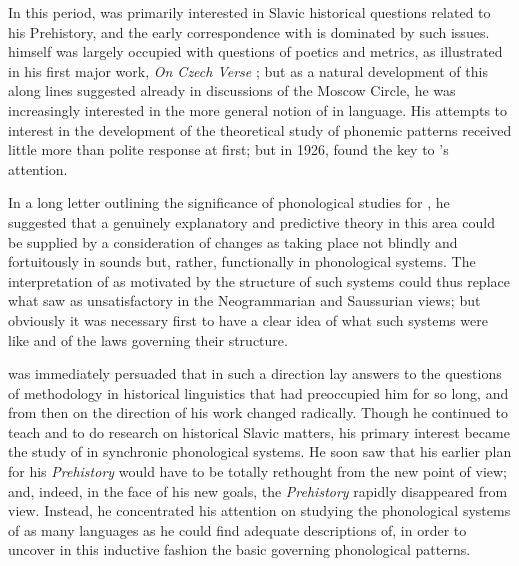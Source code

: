 In this period, {\Trubetzkoy} was primarily interested in Slavic
historical ques\-tions related to his Prehistory, and the early
correspondence with {\Jakobson} is dominated by such issues. {\Jakobson}
himself was largely occupied with questions of poetics and metrics, as
illustrated in his first major work, \textsl{On {Czech} Verse}
\citep{jakobson23:o.cesskom.stixe}; but as a natural development of
this along lines suggested already in discussions of the Moscow
Circle, he was increasingly interested in the more general notion of
 in language. His attempts to interest {\Trubetzkoy} in
the development of the theoretical study of phonemic patterns received
little more than polite response at first; but in 1926, {\Jakobson} found
the key to {\Trubetzkoy}'s attention.

In a long letter outlining the significance of phonological studies
for , he suggested that a genuinely explanatory and
predictive theory in this area could be supplied by a consideration of
changes as taking place not blindly and fortuitously in sounds but,
rather, functionally in phonological systems. The interpretation of
 as motivated by the structure of such systems could thus
replace what {\Jakobson} saw as unsatisfactory in the Neogrammarian and
Saussurian views; but obviously it was necessary first to have a clear
idea of what such systems were like and of the laws governing their
structure.

{\Trubetzkoy} was immediately persuaded that in such a direction lay
answers to the questions of methodology in historical linguistics that
had preoccupied him for so long, and from then on the direction of his
work changed radically. Though he continued to teach and to do
research on historical Slavic matters, his primary interest became the
study of  in synchronic phonological systems. He soon saw
that his earlier plan for his \textsl{Prehistory} would have to be totally
rethought from the new point of view; and, indeed, in the face of his
new goals, the \textsl{Prehistory} rapidly disappeared from view. Instead, he
concentrated his attention on studying the phonological systems of as
many languages as he could find adequate descriptions of, in order to
uncover in this inductive fashion the basic  governing
phonological patterns.

